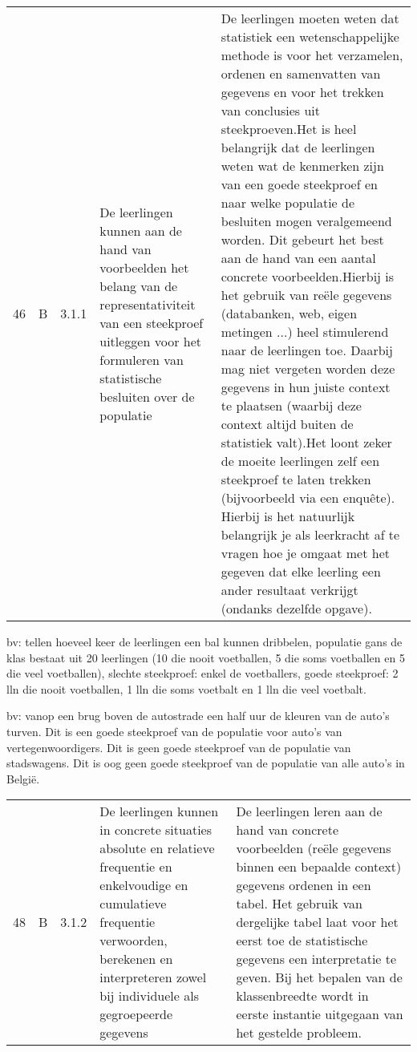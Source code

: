 \documentclass[11pt]{article}
\begin{document}
\begin{tabular}{l|l|l|p{6cm}|p{7cm}}
  46 & B & 3.1.1 & De leerlingen kunnen aan de hand van voorbeelden het belang van de representativiteit van een steekproef uitleggen voor het formuleren van statistische besluiten over de populatie & De leerlingen moeten weten dat statistiek een wetenschappelijke methode is voor het verzamelen, ordenen en samenvatten van gegevens en voor het trekken van conclusies uit steekproeven.\newline\newline Het is heel belangrijk dat de leerlingen weten wat de kenmerken zijn van een goede steekproef en naar welke populatie de besluiten mogen veralgemeend worden. Dit gebeurt het best aan de hand van een aantal concrete voorbeelden.\newline\newline Hierbij is het gebruik van reële gegevens (databanken, web, eigen metingen ...) heel stimulerend naar de leerlingen toe. Daarbij mag niet vergeten worden deze gegevens in hun juiste context te plaatsen (waarbij deze context altijd buiten de statistiek valt).\newline\newline Het loont zeker de moeite leerlingen zelf een steekproef te laten trekken (bijvoorbeeld via een enquête). Hierbij is het natuurlijk belangrijk je als leerkracht af te vragen hoe je omgaat met het gegeven dat elke leerling een ander resultaat verkrijgt (ondanks dezelfde opgave).\\
\end{tabular}

bv: tellen hoeveel keer de leerlingen een bal kunnen dribbelen, populatie gans de klas bestaat uit 20 leerlingen (10 die nooit voetballen, 5 die soms voetballen en 5 die veel voetballen), slechte steekproef: enkel de voetballers, goede steekproef: 2 lln die nooit voetballen, 1 lln die soms voetbalt en 1 lln die veel voetbalt.

bv: vanop een brug boven de autostrade een half uur de kleuren van de auto's turven. Dit is een goede steekproef van de populatie voor auto's van vertegenwoordigers. Dit is geen goede steekproef van de populatie van stadswagens. Dit is oog geen goede steekproef van de populatie van alle auto's in België.

\begin{tabular}{l|l|l|p{6cm}|p{7cm}}
  48 & B & 3.1.2 & De leerlingen kunnen in concrete situaties absolute en relatieve frequentie en enkelvoudige en cumulatieve frequentie verwoorden, berekenen en interpreteren zowel bij individuele als gegroepeerde gegevens & De leerlingen leren aan de hand van concrete voorbeelden (reële gegevens binnen een bepaalde context) gegevens ordenen in een tabel. Het gebruik van dergelijke tabel laat voor het eerst toe de statistische gegevens een interpretatie te geven. Bij het bepalen van de klassenbreedte wordt in eerste instantie uitgegaan van het gestelde probleem.\\
\end{tabular}
\end{document}
